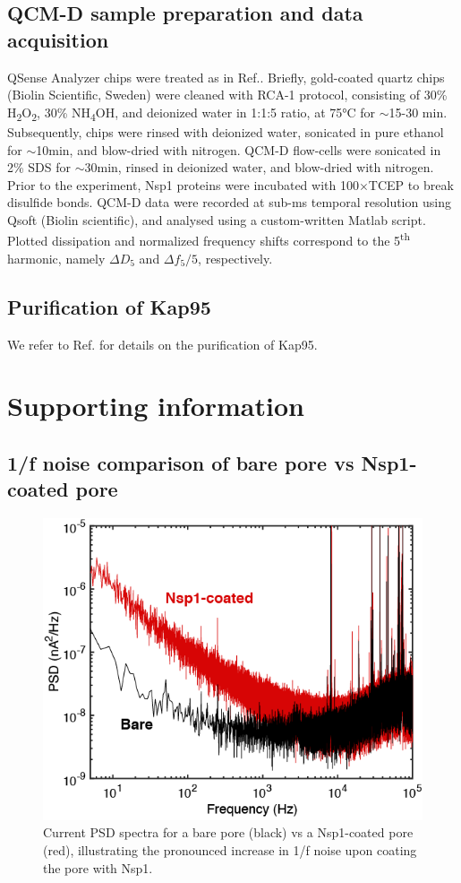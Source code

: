 \subsection{QCM-D sample preparation and data acquisition}
QSense Analyzer chips were treated as in Ref.\cite{Fragasso2021}. Briefly, gold-coated quartz chips (Biolin Scientific, Sweden) were cleaned with RCA-1 protocol, consisting of 30\% H\textsubscript{2}O\textsubscript{2}, 30\% NH\textsubscript{4}OH, and deionized water in 1:1:5 ratio, at 75°C for $\sim$15-30 min. Subsequently, chips were rinsed with deionized water, sonicated in pure ethanol for  $\sim$10min, and blow-dried with nitrogen. QCM-D flow-cells were sonicated in 2\% SDS for  $\sim$30min, rinsed in deionized water, and blow-dried with nitrogen. Prior to the experiment, Nsp1 proteins were incubated with 100$\times$TCEP to break disulfide bonds. QCM-D data were recorded at sub-ms temporal resolution using Qsoft (Biolin scientific), and analysed using a custom-written Matlab script. Plotted dissipation and normalized frequency shifts correspond to the 5\textsuperscript{th} harmonic, namely $\Delta D_5$ and $\Delta f_5/5$, respectively.

\subsection{Purification of Kap95}
We refer to Ref.\cite{Fragasso2021} for details on the purification of Kap95.

\newpage
\section{Supporting information}
\renewcommand{\thefigure}{S\thechapter.\arabic{figure}}
\renewcommand{\thetable}{S\thechapter.\arabic{table}}
\renewcommand{\theequation}{S\thechapter.\arabic{equation}}

\subsection{1/f noise comparison of bare pore vs Nsp1-coated pore}

\begin{figure}[!htbp]
	\centering
	\includegraphics[width=0.7\linewidth]{figures/Figure7.5.png}
	\caption{Current PSD spectra for a bare pore (black) vs a Nsp1-coated pore (red), illustrating the pronounced increase in 1/f noise upon coating the pore with Nsp1.}
	\label{fig:fig7.5}
\end{figure}

